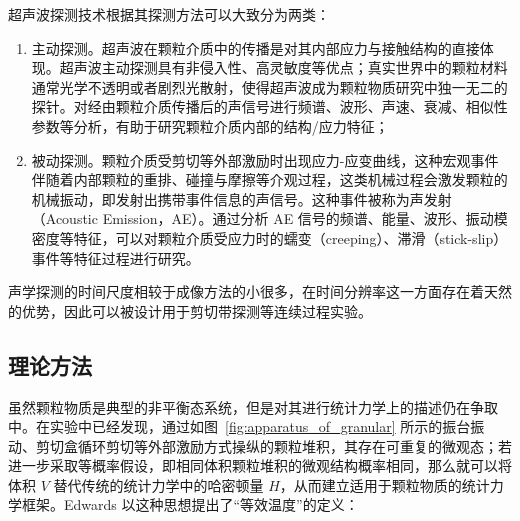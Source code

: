 超声波探测技术根据其探测方法可以大致分为两类：

\begin{enumerate}
  \item 主动探测。超声波在颗粒介质中的传播是对其内部应力与接触结构的直接体现\cite{PhysRevB.48.15646,Jia1999UltrasoundPI,Transitional}。超声波主动探测具有非侵入性、高灵敏度等优点；真实世界中的颗粒材料通常光学不透明或者剧烈光散射，使得超声波成为颗粒物质研究中独一无二的探针。对经由颗粒介质传播后的声信号进行频谱、波形、声速、衰减、相似性参数等分析，有助于研究颗粒介质内部的结构/应力特征；
  \item 被动探测。颗粒介质受剪切等外部激励时出现应力-应变曲线，这种宏观事件伴随着内部颗粒的重排、碰撞与摩擦等介观过程，这类机械过程会激发颗粒的机械振动，即发射出携带事件信息的声信号。这种事件被称为声发射（Acoustic Emission，AE）。通过分析 AE 信号的频谱、能量、波形、振动模密度等特征\cite{PhysRevLett.120.218003,10.1029/2023JB026612,doi:10.1073/pnas.2305134120}，可以对颗粒介质受应力时的蠕变（creeping）、滞滑（stick-slip）事件等特征过程进行研究。
\end{enumerate}

声学探测的时间尺度相较于成像方法的小很多，在时间分辨率这一方面存在着天然的优势\cite{PhysRevE.84.020301}，因此可以被设计用于剪切带探测\cite{PhysRevE.85.051302}等连续过程实验。


\subsection{理论方法}

虽然颗粒物质是典型的非平衡态系统，但是对其进行统计力学上的描述仍在争取中。在实验中已经发现，通过如图~\eqref{fig:apparatus_of_granular} 所示的振台振动、剪切盒循环剪切等外部激励方式操纵的颗粒堆积，其存在可重复的微观态；若进一步采取等概率假设，即相同体积颗粒堆积的微观结构概率相同，那么就可以将体积 $V$ 替代传统的统计力学中的哈密顿量 $H$，从而建立适用于颗粒物质的统计力学框架。Edwards 以这种思想提出了“等效温度”的定义\cite{EDWARDS19891080}：

